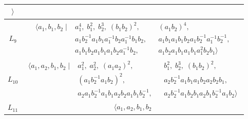 \documentclass[dvipsnames]{article}
\theoremstyle{definition}
\theoremstyle{remark}
\begin{document}
\begin{longtable}{ |c|c| }
\begin{minipage}{6cm}
{\begin{align*}
            \big \rangle
        \end{align*}
        \vspace{-5mm}
        }
    \end{minipage}\\
    \hline
    $L_9$    
    &
    \begin{minipage}{6cm}
        {
        \vspace{-2.5mm}
        \begin{align*}
            \big \langle
            a_1, b_1, b_2
            \; \big | \;
            &a_1^4, \;
            b_1^2, \;
            b_2^3, \;
            (b_1 b_2)^2, 
            && (a_1 b_2)^4,\\
            & a_1 b_2^{-1} a_1 b_1 a_1^{-1} b_2 a_1^{-1} b_1 b_2, 
            && a_1 b_1 a_1 b_1 b_2 a_1 b_2^{-1} a_1^{-1} b_2^{-1},\\
            & a_1 b_1 b_2 a_1 b_1 a_1 b_2 a_1^{-1} b_2,
            && a_1 b_2 a_1 b_1 a_1 b_1 a_1^2 b_2 b_1
            \big \rangle
        \end{align*}
        \vspace{-5mm}
        }
    \end{minipage}\\
    \hline
    $L_{10}$    
    &
    \begin{minipage}{6cm}
        {
        \vspace{-2.5mm}
        \begin{align*}
            \big \langle
            a_1, a_2, b_1, b_2
            \; \big | \;
            & a_1^2, \;
            a_2^2, \;
            (a_1 a_2)^2,
            && b_1^2, \;
            b_2^3, \;
            (b_1 b_2)^2, \\
            & (a_1 b_2^{-1} a_1 b_2)^2,
            && a_2 b_2^{-1} a_1 b_1 a_1 b_2 a_2 b_2 b_1, \\
            & a_2 a_1 b_2^{-1} a_1 b_1 a_2 b_2 a_1 b_1 b_2^{-1},
            && a_2 b_2^{-1} a_1 b_2 b_1 a_2 b_1 b_2^{-1} a_1 b_2
            \big \rangle
        \end{align*}
        \vspace{-5mm}
        }
    \end{minipage}\\
    \hline
    $L_{11}$    
    &
    \begin{minipage}{6cm}
        {
        \vspace{-2.5mm}
        \begin{align*}
            \big \langle
            a_1, a_2, b_1, b_2

\end{align*}}
\end{minipage}
\end{longtable}
\end{document}
